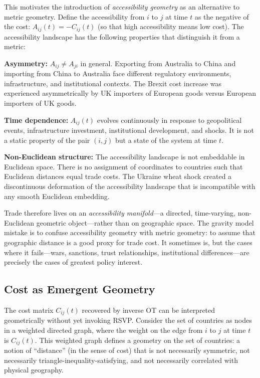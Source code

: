 \documentclass[12pt]{article}
\begin{document}
This motivates the introduction of \emph{accessibility geometry} as an alternative to metric geometry. Define the accessibility from $i$ to $j$ at time $t$ as the negative of the cost: $A_{ij}(t) = -C_{ij}(t)$ (so that high accessibility means low cost). The accessibility landscape has the following properties that distinguish it from a metric:

\textbf{Asymmetry:} $A_{ij} \neq A_{ji}$ in general. Exporting from Australia to China and importing from China to Australia face different regulatory environments, infrastructure, and institutional contexts. The Brexit cost increase was experienced asymmetrically by UK importers of European goods versus European importers of UK goods.

\textbf{Time dependence:} $A_{ij}(t)$ evolves continuously in response to geopolitical events, infrastructure investment, institutional development, and shocks. It is not a static property of the pair $(i,j)$ but a state of the system at time $t$.

\textbf{Non-Euclidean structure:} The accessibility landscape is not embeddable in Euclidean space. There is no assignment of coordinates to countries such that Euclidean distances equal trade costs. The Ukraine wheat shock created a discontinuous deformation of the accessibility landscape that is incompatible with any smooth Euclidean embedding.

Trade therefore lives on an \emph{accessibility manifold}---a directed, time-varying, non-Euclidean geometric object---rather than on geographic space. The gravity model mistake is to confuse accessibility geometry with metric geometry: to assume that geographic distance is a good proxy for trade cost. It sometimes is, but the cases where it fails---wars, sanctions, trust relationships, institutional differences---are precisely the cases of greatest policy interest.

\subsection{Cost as Emergent Geometry}

The cost matrix $C_{ij}(t)$ recovered by inverse OT can be interpreted geometrically without yet invoking RSVP. Consider the set of countries as nodes in a weighted directed graph, where the weight on the edge from $i$ to $j$ at time $t$ is $C_{ij}(t)$. This weighted graph defines a geometry on the set of countries: a notion of ``distance'' (in the sense of cost) that is not necessarily symmetric, not necessarily triangle-inequality-satisfying, and not necessarily correlated with physical geography.
\end{document}
